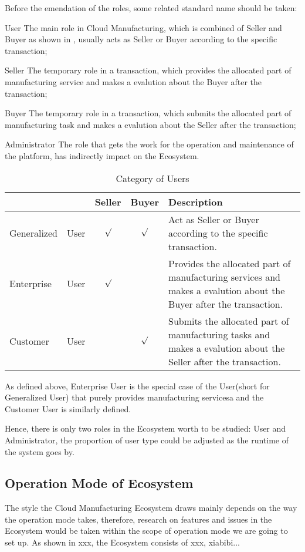 Before the emendation of the roles, some related standard name should be taken:
\begin{asparadesc}
\item[User] The main role in Cloud Manufacturing, which is combined of Seller and Buyer as shown in , usually acts as Seller or Buyer according to the specific transaction;
\item[Seller] The temporary role in a transaction, which provides the allocated part of manufacturing service and makes a evalution about the Buyer after the transaction;
\item[Buyer] The temporary role in a transaction, which submits the allocated part of manufacturing task and makes a evalution about the Seller after the transaction;
\item[Administrator] The role that gets the work for the operation and maintenance of the platform, has indirectly impact on the Ecosystem.
\end{asparadesc}
\begin{table}[htbp]
  \centering\small
  \caption{Category of Users}
    \begin{tabularx}{\textwidth}{llccX}
    \toprule
        &  & Seller & Buyer & Description \\
    \midrule
    Generalized &User & $\surd$ & $\surd$ & Act as Seller or Buyer according to the specific transaction. \\
    Enterprise &User & $\surd$ & &  Provides the allocated part of manufacturing services and makes a evalution about the Buyer after the transaction. \\
    Customer &User& & $\surd$ &  Submits the allocated part of manufacturing tasks and makes a evalution about the Seller after the transaction.\\
    \bottomrule
    \end{tabularx}%
  \label{tab:categoryuser}%
\end{table}%
As defined above, Enterprise User is the special case of the User(short for Generalized User) that purely provides manufacturing servicesa and the Customer User is similarly defined.

Hence, there is only two roles in the Ecosystem worth to be studied: User and Administrator, the proportion of user type could be adjusted as the runtime of the system goes by.

\subsection{Operation Mode of Ecosystem}
The style the Cloud Manufacturing Ecosystem draws mainly depends on the way the operation mode takes, therefore, research on features and issues in the Ecosystem would be taken within the scope of operation mode we are going to set up. As shown in xxx, the Ecosystem consists of xxx,  xiabibi...

